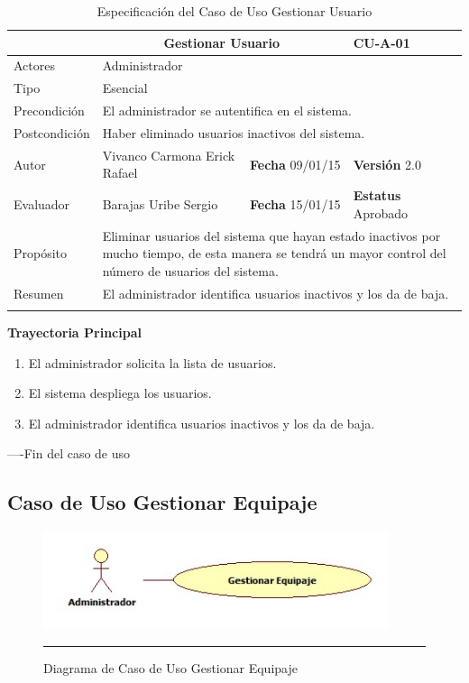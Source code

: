 \begin{longtable}{|p{2.5cm}|p{6.4cm}|p{2cm}|p{2cm}|}
	\hline
		\rowcolor[RGB]{51,153,255}{Caso de Uso}&\multicolumn{2}{c}{Gestionar Usuario}&{\textbf{CU-A-01}}\\
	\hline
		{Actores}&\multicolumn{3}{p{11.2cm}|}{Administrador}\\
	\hline
		{Tipo}&\multicolumn{3}{p{11.2cm}|}{Esencial}\\
	\hline
		{Precondición}&\multicolumn{3}{p{11.2cm}|}{El administrador se autentifica en el sistema.}\\
	\hline
		{Postcondición}&\multicolumn{3}{p{11.2cm}|}{Haber eliminado usuarios inactivos del sistema.}\\
	\hline
		{Autor}&{Vivanco Carmona Erick Rafael}&{\textbf{Fecha} 09/01/15}&{\textbf{Versión} 2.0}\\
			\hline
		{Evaluador}&{Barajas Uribe Sergio}&{\textbf{Fecha} 15/01/15}&{\textbf{Estatus} Aprobado}\\
	\hline
		{Propósito}&\multicolumn{3}{p{11.2cm}|}{Eliminar usuarios del sistema que hayan estado inactivos por mucho tiempo, de esta manera se tendrá un mayor control del número de usuarios del sistema.}\\
	\hline
		{Resumen}&\multicolumn{3}{p{11.2cm}|}{El administrador identifica usuarios inactivos y los da de baja.}\\	
	\hline
	\caption[Especificación del Caso de Uso Gestionar Usuario]{Especificación del Caso de Uso Gestionar Usuario}
    	\label{tab:cuGestionarUsuario}
\end{longtable}

\begin{flushleft}
	\textbf{Trayectoria Principal}\\
	\begin{enumerate}
		\item El administrador solicita la lista de usuarios.
		\item El sistema despliega los usuarios.
		\item El administrador identifica usuarios inactivos y los da de baja.
	\end{enumerate}
\end{flushleft}
----Fin del caso de uso
\clearpage

\subsection{Caso de Uso Gestionar Equipaje}

\begin{figure}[htbp]
	\centering
		\includegraphics[width=0.9\textwidth]{Figuras/cuGestionarEquipaje.jpg}
		\rule{30em}{0.5pt}
	\caption[Diagrama de Caso de Uso Gestionar Equipaje]{Diagrama de Caso de Uso Gestionar Equipaje}
	\label{fig:cuGestionarEquipaje}
\end{figure}

